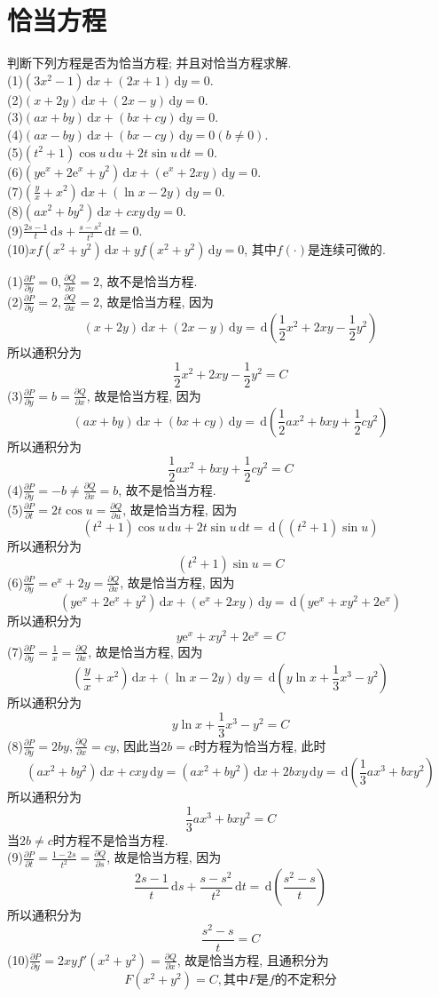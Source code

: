 \documentclass[titlepage,11pt,a4paper,twoside]{report}
\makeatletter
\newcommand\diff{\,\mathrm{d}}
\newcommand\e{\mathrm{e}}
\newenvironment{solve}{\par
	\pushQED{\qed}%
	\normalfont \topsep1\p@\@plus6\p@\relax
	\trivlist
	\item\relax
	{\hspace*{\parindent}{\heiti 解}\@addpunct{:}}\hspace\labelsep\ignorespaces
}{%
	\popQED\endtrivlist\@endpefalse
}
\makeatother
\begin{document}
\section{恰当方程}
判断下列方程是否为恰当方程; 并且对恰当方程求解.\\
(1)$(3x^2-1)\diff x+(2x+1)\diff y=0$.\\
(2)$(x+2y)\diff x+(2x-y)\diff y=0$.\\
(3)$(ax+by)\diff x+(bx+cy)\diff y=0$.\\
(4)$(ax-by)\diff x+(bx-cy)\diff y=0(b\neq0)$.\\
(5)$(t^2+1)\cos u\diff u+2t\sin u\diff t=0$.\\
(6)$(y\e^x+2\e^x+y^2)\diff x+(\e^x+2xy)\diff y=0$.\\
(7)$\displaystyle\left(\frac{y}{x}+x^2\right)\diff x+(\ln x-2y)\diff y=0$.\\
(8)$(ax^2+by^2)\diff x+cxy\diff y=0$.\\
(9)$\displaystyle\frac{2s-1}{t}\diff s+\frac{s-s^2}{t^2}\diff t=0$.\\
(10)$xf(x^2+y^2)\diff x+yf(x^2+y^2)\diff y=0$, 其中$f(\cdot)$是连续可微的.
\begin{solve}(1)$\frac{\partial P}{\partial y}=0,\frac{\partial Q}{\partial x}=2$, 故不是恰当方程.\\
(2)$\frac{\partial P}{\partial y}=2,\frac{\partial Q}{\partial x}=2$, 故是恰当方程, 因为
\[(x+2y)\diff x+(2x-y)\diff y=\diff\left(\frac{1}{2}x^2+2xy-\frac{1}{2}y^2\right)\]
所以通积分为
\[\frac{1}{2}x^2+2xy-\frac{1}{2}y^2=C\]
(3)$\frac{\partial P}{\partial y}=b=\frac{\partial Q}{\partial x}$, 故是恰当方程, 因为
\[(ax+by)\diff x+(bx+cy)\diff y=\diff\left(\frac{1}{2}ax^2+bxy+\frac{1}{2}cy^2\right)\]
所以通积分为
\[\frac{1}{2}ax^2+bxy+\frac{1}{2}cy^2=C\]
(4)$\frac{\partial P}{\partial y}=-b\neq\frac{\partial Q}{\partial x}=b$, 故不是恰当方程.\\
(5)$\frac{\partial P}{\partial t}=2t\cos u=\frac{\partial Q}{\partial u}$, 故是恰当方程, 因为
\[(t^2+1)\cos u\diff u+2t\sin u\diff t=\diff\left((t^2+1)\sin u\right)\]
所以通积分为
\[(t^2+1)\sin u=C\]
(6)$\frac{\partial P}{\partial y}=\e^x+2y=\frac{\partial Q}{\partial x}$, 故是恰当方程, 因为
\[(y\e^x+2\e^x+y^2)\diff x+(\e^x+2xy)\diff y=\diff(y\e^x+xy^2+2\e^x)\]
所以通积分为
\[y\e^x+xy^2+2\e^x=C\]
(7)$\frac{\partial P}{\partial y}=\frac{1}{x}=\frac{\partial Q}{\partial x}$, 故是恰当方程, 因为
\[\left(\frac{y}{x}+x^2\right)\diff x+(\ln x-2y)\diff y=\diff\left(y\ln x+\frac{1}{3}x^3-y^2\right)\]
所以通积分为
\[y\ln x+\frac{1}{3}x^3-y^2=C\]
(8)$\frac{\partial P}{\partial y}=2by,\frac{\partial Q}{\partial x}=cy$, 因此当$2b=c$时方程为恰当方程, 此时
\[(ax^2+by^2)\diff x+cxy\diff y=(ax^2+by^2)\diff x+2bxy\diff y=\diff\left(\frac{1}{3}ax^3+bxy^2\right)\]
所以通积分为
\[\frac{1}{3}ax^3+bxy^2=C\]
当$2b\neq c$时方程不是恰当方程.\\
(9)$\frac{\partial P}{\partial t}=\frac{1-2s}{t^2}=\frac{\partial Q}{\partial s}$, 故是恰当方程, 因为
\[\frac{2s-1}{t}\diff s+\frac{s-s^2}{t^2}\diff t=\diff\left(\frac{s^2-s}{t}\right)\]
所以通积分为
\[\frac{s^2-s}{t}=C\]
(10)$\frac{\partial P}{\partial y}=2xyf'(x^2+y^2)=\frac{\partial Q}{\partial x}$, 故是恰当方程, 且通积分为
\[F(x^2+y^2)=C,\mbox{其中}F\mbox{是}f\mbox{的不定积分}\]
\end{solve}
\end{document}
